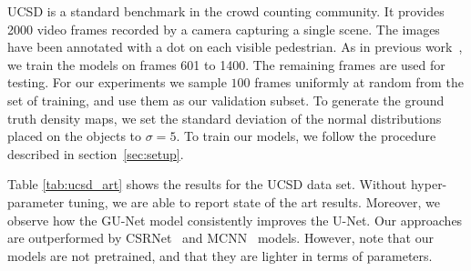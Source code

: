 \documentclass{bmvc2k}
\begin{document}
\textsc{UCSD} is a standard benchmark in the crowd counting community. It provides 2000 video frames recorded by a camera capturing a single scene. The images have been annotated with a dot on each visible pedestrian. As in previous work~\cite{chan2008}, we train the models on frames 601 to 1400. The remaining frames are used for testing. For our experiments we sample $100$ frames uniformly at random from the set of training, and use them as our validation subset. To generate the ground truth density maps, we set the standard deviation of the normal distributions placed on the objects to $\sigma=5$. To train our models, we follow the procedure described in section~\ref{sec:setup}.

Table \ref{tab:ucsd_art} shows the results for the \textsc{UCSD} data set. Without hyper-parameter tuning, we are able to report state of the art results. Moreover, we observe how the GU-Net model consistently improves the U-Net. Our approaches are outperformed by CSRNet~\cite{yuhong2018_csrnet} and MCNN~\cite{zhang2016} models. However, note that our models are not pretrained, and that they are lighter in terms of parameters.
\end{document}
